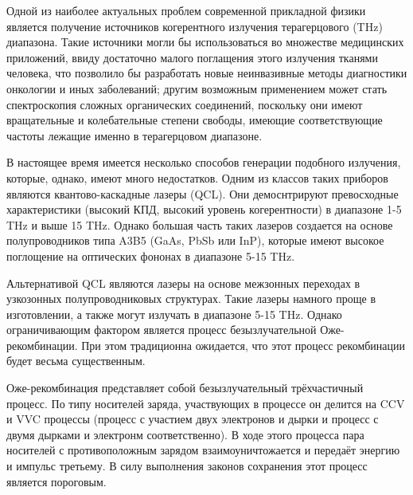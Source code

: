 
Одной из наиболее актуальных проблем современной прикладной физики является
получение источников когерентного излучения терагерцового (THz) диапазона. Такие
источники могли бы использоваться во множестве медицинских приложений, ввиду достаточно 
малого поглащения этого излучения тканями человека, что позволило бы разработать 
новые неинвазивные методы диагностики онкологии и иных заболеваний; другим возможным 
применением может стать спектроскопия сложных органических соединений, поскольку 
они имеют вращательные и колебательные степени свободы, имеющие соответствующие частоты 
лежащие именно в терагерцовом диапазоне.

В настоящее время имеется несколько способов генерации подобного излучения, которые, однако, 
имеют много недостатков. Одним из классов таких приборов являются квантово-каскадные лазеры (QCL).
Они демоснтрируют превосходные характеристики (высокий КПД, высокий уровень когерентности)
в диапазоне 1-5 THz и выше 15 THz. Однако большая часть таких лазеров создается на основе 
полупроводников типа A3B5 (GaAs, PbSb или InP), которые имеют высокое поглощение на оптических 
фононах в диапазоне 5-15 THz.

Альтернативой QCL являются лазеры на основе межзонных переходах в узкозонных полупроводниковых структурах.
Такие лазеры намного проще в изготовлении, а также могут излучать в диапазоне 5-15 THz. Однако ограничивающим
фактором является процесс безызлучательной Оже-рекомбинации. При этом традиционна ожидается, что этот процесс
рекомбинации будет весьма существенным.

Оже-рекомбинация представляет собой безызлучательный трёхчастичный процесс. По типу носителей заряда, участвующих
в процессе он делится на CCV и VVC процессы (процесс с участием двух электронов и дырки и процесс с двумя дырками
и электронм соответственно). В ходе этого процесса пара носителей с противоположным зарядом взаимоуничтожается и
передаёт энергию и импульс третьему. В силу выполнения законов сохранения этот процесс является пороговым.


